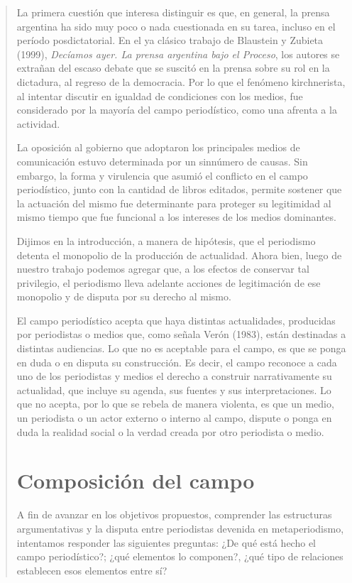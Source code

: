 \begin{quote}
La primera cuestión que interesa distinguir es que, en general, la prensa argentina ha sido muy poco o nada cuestionada en su tarea, incluso en el período posdictatorial. En el ya clásico trabajo de Blaustein y Zubieta (1999), \emph{Decíamos ayer. La prensa argentina bajo el Proceso}, los autores se extrañan del escaso debate que se suscitó en la prensa sobre su rol en la dictadura, al regreso de la democracia. Por lo que el fenómeno kirchnerista, al intentar discutir en igualdad de condiciones con los medios, fue considerado por la mayoría del campo periodístico, como una afrenta a la actividad.

La oposición al gobierno que adoptaron los principales medios de comunicación estuvo determinada por un sinnúmero de causas. Sin embargo, la forma y virulencia que asumió el conflicto en el campo periodístico, junto con la cantidad de libros editados, permite sostener que la actuación del mismo fue determinante para proteger su legitimidad al mismo tiempo que fue funcional a los intereses de los medios dominantes.

Dijimos en la introducción, a manera de hipótesis, que el periodismo detenta el monopolio de la producción de actualidad. Ahora bien, luego de nuestro trabajo podemos agregar que, a los efectos de conservar tal privilegio, el periodismo lleva adelante acciones de legitimación de ese monopolio y de disputa por su derecho al mismo.

El campo periodístico acepta que haya distintas actualidades, producidas por periodistas o medios que, como señala Verón (1983), están destinadas a distintas audiencias. Lo que no es aceptable para el campo, es que se ponga en duda o en disputa su construcción. Es decir, el campo reconoce a cada uno de los periodistas y medios el derecho a construir narrativamente su actualidad, que incluye su agenda, sus fuentes y sus interpretaciones. Lo que no acepta, por lo que se rebela de manera violenta, es que un medio, un periodista o un actor externo o interno al campo, dispute o ponga en duda la realidad social o la verdad creada por otro periodista o medio.

\section {Composición del campo}

A fin de avanzar en los objetivos propuestos, comprender las estructuras argumentativas y la disputa entre periodistas devenida en metaperiodismo, intentamos responder las siguientes preguntas: ¿De qué está hecho el campo periodístico?; ¿qué elementos lo componen?, ¿qué tipo de relaciones establecen esos elementos entre sí?


\end{quote}
